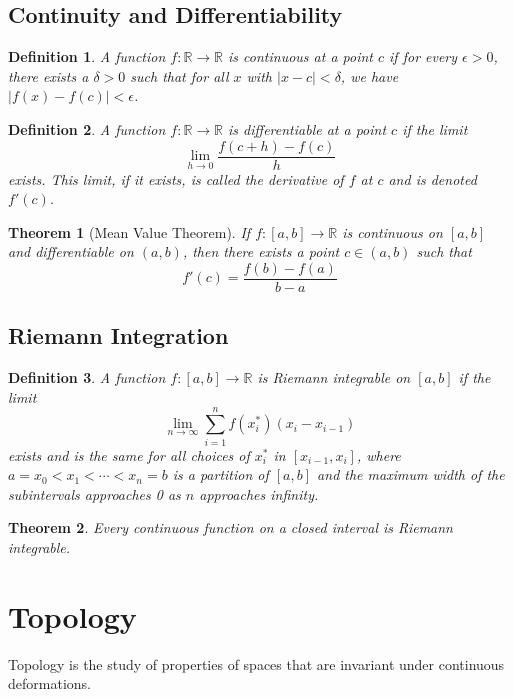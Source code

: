 \documentclass[12pt,a4paper]{article}
\newtheorem{definition}{Definition}
\newtheorem{theorem}{Theorem}
\begin{document}
\subsection{Continuity and Differentiability}

\begin{definition}
A function $f: \mathbb{R} \to \mathbb{R}$ is continuous at a point $c$ if for every $\epsilon > 0$, there exists a $\delta > 0$ such that for all $x$ with $|x - c| < \delta$, we have $|f(x) - f(c)| < \epsilon$.
\end{definition}

\begin{definition}
A function $f: \mathbb{R} \to \mathbb{R}$ is differentiable at a point $c$ if the limit
\[ \lim_{h \to 0} \frac{f(c + h) - f(c)}{h} \]
exists. This limit, if it exists, is called the derivative of $f$ at $c$ and is denoted $f'(c)$.
\end{definition}

\begin{theorem}[Mean Value Theorem]
If $f: [a,b] \to \mathbb{R}$ is continuous on $[a,b]$ and differentiable on $(a,b)$, then there exists a point $c \in (a,b)$ such that
\[ f'(c) = \frac{f(b) - f(a)}{b - a} \]
\end{theorem}

\subsection{Riemann Integration}

\begin{definition}
A function $f: [a,b] \to \mathbb{R}$ is Riemann integrable on $[a,b]$ if the limit
\[ \lim_{n \to \infty} \sum_{i=1}^n f(x_i^*)(x_i - x_{i-1}) \]
exists and is the same for all choices of $x_i^*$ in $[x_{i-1}, x_i]$, where $a = x_0 < x_1 < \cdots < x_n = b$ is a partition of $[a,b]$ and the maximum width of the subintervals approaches 0 as $n$ approaches infinity.
\end{definition}

\begin{theorem}
Every continuous function on a closed interval is Riemann integrable.
\end{theorem}

\section{Topology}

Topology is the study of properties of spaces that are invariant under continuous deformations.
\end{document}
